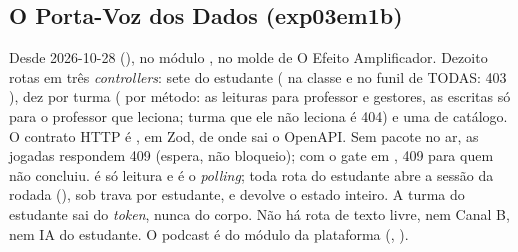 \subsection{O Porta-Voz dos Dados (exp03em1b)}
\label{sec:api-porta-voz-dos-dados}


Desde 2026-10-28 (), no módulo , no
molde de O Efeito Amplificador. Dezoito rotas em três \emph{controllers}:
sete do estudante ( na classe e
 no funil de TODAS: 403 ),
dez por turma ( por método: as leituras para professor e
gestores, as escritas só para o professor que leciona; turma que ele não
leciona é 404) e uma de catálogo. O contrato HTTP é
, em Zod, de onde sai o OpenAPI. Sem pacote no
ar, as jogadas respondem 409  (espera, não
bloqueio); com o gate em , 409  para quem não
concluiu.  é só leitura e é o \emph{polling}; toda rota
 do estudante abre a sessão da rodada (), sob
trava por estudante, e devolve o estado inteiro. A turma do estudante sai do
\emph{token}, nunca do corpo. Não há rota de texto livre, nem Canal B, nem IA
do estudante. O podcast é do módulo da plataforma
(, ).

